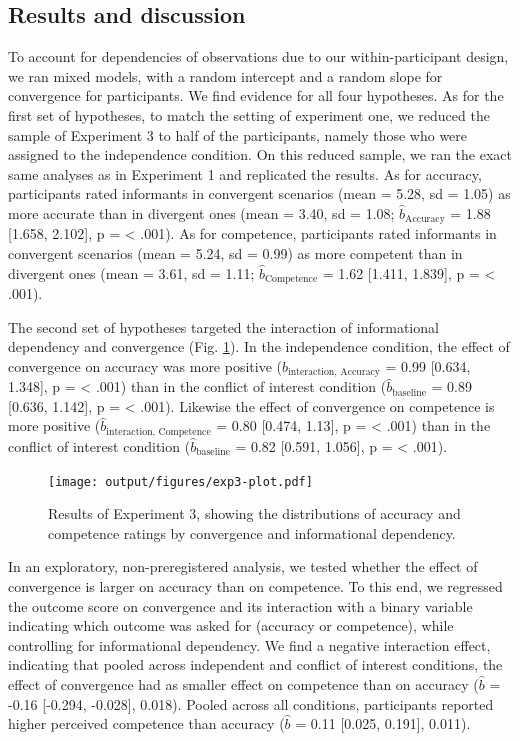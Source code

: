 \documentclass[
  doc,floatsintext]{apa6}
\begin{document}
\subsection{Results and discussion}\label{results-and-discussion-2}

To account for dependencies of observations due to our within-participant design, we ran mixed models, with a random intercept and a random slope for convergence for participants. We find evidence for all four hypotheses. As for the first set of hypotheses, to match the setting of experiment one, we reduced the sample of Experiment 3 to half of the participants, namely those who were assigned to the independence condition. On this reduced sample, we ran the exact same analyses as in Experiment 1 and replicated the results. As for accuracy, participants rated informants in convergent scenarios (mean = 5.28, sd = 1.05) as more accurate than in divergent ones (mean = 3.40, sd = 1.08; \(\hat{b}_{\text{Accuracy}}\) = 1.88 {[}1.658, 2.102{]}, p = \textless{} .001). As for competence, participants rated informants in convergent scenarios (mean = 5.24, sd = 0.99) as more competent than in divergent ones (mean = 3.61, sd = 1.11; \(\hat{b}_{\text{Competence}}\) = 1.62 {[}1.411, 1.839{]}, p = \textless{} .001).

The second set of hypotheses targeted the interaction of informational dependency and convergence (Fig. \ref{fig:exp3-plot}). In the independence condition, the effect of convergence on accuracy was more positive (\(\hat{b}_{\text{interaction, Accuracy}}\) = 0.99 {[}0.634, 1.348{]}, p = \textless{} .001) than in the conflict of interest condition (\(\hat{b}_{\text{baseline}}\) = 0.89 {[}0.636, 1.142{]}, p = \textless{} .001). Likewise the effect of convergence on competence is more positive (\(\hat{b}_{\text{interaction, Competence}}\) = 0.80 {[}0.474, 1.13{]}, p = \textless{} .001) than in the conflict of interest condition (\(\hat{b}_{\text{baseline}}\) = 0.82 {[}0.591, 1.056{]}, p = \textless{} .001).



\begin{figure}
\centering
\texttt{[image: output/figures/exp3-plot.pdf]}
\caption{\label{fig:exp3-plot}Results of Experiment 3, showing the distributions of accuracy and competence ratings by convergence and informational dependency.}
\end{figure}

In an exploratory, non-preregistered analysis, we tested whether the effect of convergence is larger on accuracy than on competence. To this end, we regressed the outcome score on convergence and its interaction with a binary variable indicating which outcome was asked for (accuracy or competence), while controlling for informational dependency. We find a negative interaction effect, indicating that pooled across independent and conflict of interest conditions, the effect of convergence had as smaller effect on competence than on accuracy (\(\hat{b}\) = -0.16 {[}-0.294, -0.028{]}, 0.018). Pooled across all conditions, participants reported higher perceived competence than accuracy (\(\hat{b}\) = 0.11 {[}0.025, 0.191{]}, 0.011).
\end{document}
